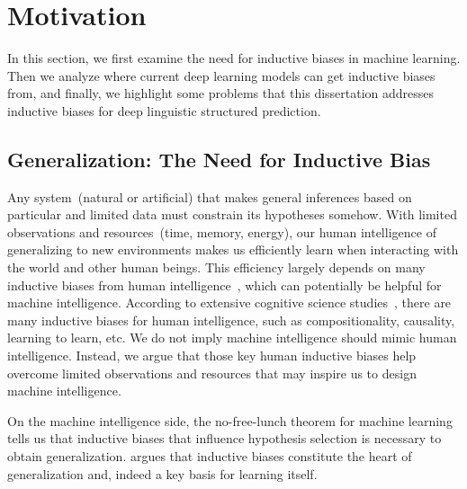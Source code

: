 \section{Motivation}
\label{sec:intro:motivation}

In this section, we first examine the need for inductive biases in
machine learning. Then we analyze where current deep learning models
can get inductive biases from, and finally, we highlight some problems
that this dissertation addresses inductive biases for deep linguistic
structured prediction.

\subsection{Generalization: The Need for Inductive Bias}
\label{ssec:intro:need-of-bias}

Any system~(natural or artificial) that makes general inferences based
on particular and limited data must constrain its hypotheses
somehow. With limited observations and resources~(time, memory,
energy), our human intelligence of generalizing to new environments
makes us efficiently learn when interacting with the world and other
human beings. This efficiency largely depends on many inductive biases
from human intelligence~\citep{Gershman2021WhatMU}, which can
potentially be helpful for machine intelligence. According to
extensive cognitive science
studies~\citep{Spelke1990PrinciplesOO,Bienenstock1996CompositionalityMP,Rehder2003ACT,harlow1949formation,
  Lake2016BuildingMT,Gershman2021WhatMU}, there are many inductive
biases for human intelligence, such as compositionality, causality,
learning to learn, etc. We do not imply machine intelligence should
mimic human intelligence. Instead, we argue that those key human
inductive biases help overcome limited observations and resources that
may inspire us to design machine intelligence.

On the machine intelligence side, the no-free-lunch theorem for
machine learning~\citep{baxter2000model,wolpert1995no} tells us that
inductive biases that influence hypothesis selection is necessary to
obtain generalization. \citet{mitchell1980need} argues that inductive
biases constitute the heart of generalization and, indeed a key basis
for learning itself.

